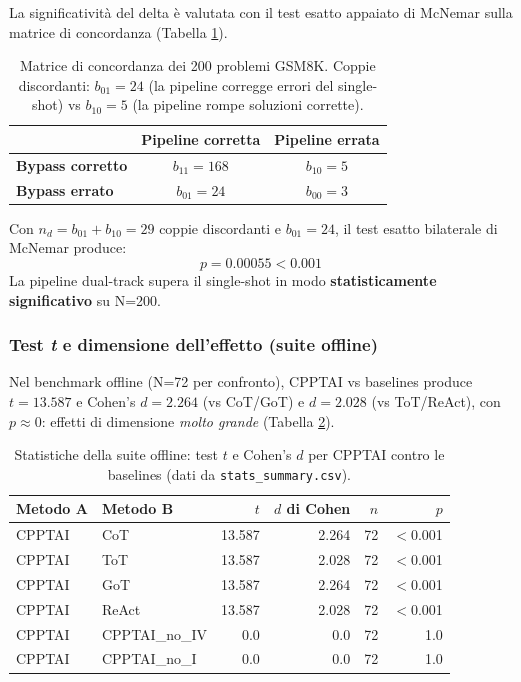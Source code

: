 \documentclass[11pt,a4paper]{article}
\begin{document}
La significatività del delta è valutata con il test esatto appaiato di McNemar
sulla matrice di concordanza (Tabella \ref{tab:mcnemar}).

\begin{table}[h!]
\centering
\begin{tabular}{lcc}
\toprule
 & \textbf{Pipeline corretta} & \textbf{Pipeline errata} \\
\midrule
\textbf{Bypass corretto}  & $b_{11} = 168$ & $b_{10} = 5$ \\
\textbf{Bypass errato}    & $b_{01} = 24$  & $b_{00} = 3$ \\
\bottomrule
\end{tabular}
\caption{Matrice di concordanza dei 200 problemi GSM8K. Coppie discordanti:
$b_{01} = 24$ (la pipeline corregge errori del single-shot) vs $b_{10} = 5$
(la pipeline rompe soluzioni corrette).}
\label{tab:mcnemar}
\end{table}

Con $n_d = b_{01} + b_{10} = 29$ coppie discordanti e $b_{01} = 24$, il test esatto
bilaterale di McNemar produce:
\begin{equation}
  \boxed{\,p = 0.00055 < 0.001\,}
  \label{eq:mcnemar}
\end{equation}
La pipeline dual-track supera il single-shot in modo \textbf{statisticamente
significativo} su N=200.

\subsubsection{Test \emph{t} e dimensione dell'effetto (suite offline)}

Nel benchmark offline (N=72 per confronto), CPPTAI vs baselines produce
$t = 13.587$ e Cohen's $d = 2.264$ (vs CoT/GoT) e $d = 2.028$ (vs ToT/ReAct),
con $p \approx 0$: effetti di dimensione \emph{molto grande} (Tabella
\ref{tab:stats}).

\begin{table}[h!]
\centering
\begin{tabular}{llrrrr}
\toprule
\textbf{Metodo A} & \textbf{Metodo B} & $t$ & $d$ di Cohen & $n$ & $p$ \\
\midrule
CPPTAI & CoT   & 13.587 & 2.264 & 72 & $<$0.001 \\
CPPTAI & ToT   & 13.587 & 2.028 & 72 & $<$0.001 \\
CPPTAI & GoT   & 13.587 & 2.264 & 72 & $<$0.001 \\
CPPTAI & ReAct & 13.587 & 2.028 & 72 & $<$0.001 \\
CPPTAI & CPPTAI\_no\_IV & 0.0 & 0.0 & 72 & 1.0 \\
CPPTAI & CPPTAI\_no\_I  & 0.0 & 0.0 & 72 & 1.0 \\
\bottomrule
\end{tabular}
\caption{Statistiche della suite offline: test $t$ e Cohen's $d$ per CPPTAI
contro le baselines (dati da \texttt{stats\_summary.csv}).}
\label{tab:stats}
\end{table}
\end{document}
